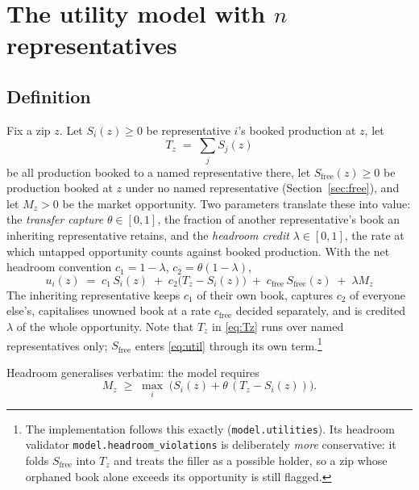 \documentclass[11pt]{article}
\theoremstyle{definition}
\newcommand{\Sfree}{S_{\mathrm{free}}}
\newcommand{\cfree}{c_{\mathrm{free}}}
\begin{document}
\section{The utility model with \texorpdfstring{$n$}{n} representatives}\label{sec:model}

\subsection{Definition}

Fix a zip $z$. Let $S_i(z)\ge0$ be representative $i$'s booked production at $z$, let
\begin{equation}\label{eq:Tz}
T_z \;=\; \sum_j S_j(z)
\end{equation}
be all production booked to a named representative there, let $\Sfree(z)\ge0$ be
production booked at $z$ under no named representative (Section~\ref{sec:free}), and let
$M_z>0$ be the market opportunity. Two parameters translate these into value: the
\emph{transfer capture} $\theta\in[0,1]$, the fraction of another representative's book
an inheriting representative retains, and the \emph{headroom credit} $\lambda\in[0,1]$,
the rate at which untapped opportunity counts against booked production. With the net
headroom convention $c_1=1-\lambda$, $c_2=\theta(1-\lambda)$,
\begin{equation}\label{eq:util}
\boxed{\;u_i(z) \;=\; c_1\,S_i(z) \;+\; c_2\bigl(T_z-S_i(z)\bigr) \;+\; \cfree\,\Sfree(z)
\;+\; \lambda M_z\;}
\end{equation}
The inheriting representative keeps $c_1$ of their own book, captures $c_2$ of everyone
else's, capitalises unowned book at a rate $\cfree$ decided separately, and is credited
$\lambda$ of the whole opportunity. Note that $T_z$ in \eqref{eq:Tz} runs over named
representatives only; $\Sfree$ enters \eqref{eq:util} through its own term.\footnote{The
implementation follows this exactly (\texttt{model.utilities}). Its headroom validator
\texttt{model.headroom\_violations} is deliberately \emph{more} conservative: it folds
$\Sfree$ into $T_z$ and treats the filler as a possible holder, so a zip whose orphaned
book alone exceeds its opportunity is still flagged.}

Headroom generalises verbatim: the model requires
\begin{equation}\label{eq:headroom}
M_z \;\ge\; \max_i\;\bigl(S_i(z) + \theta\,(T_z-S_i(z))\bigr) .
\end{equation}
\end{document}
